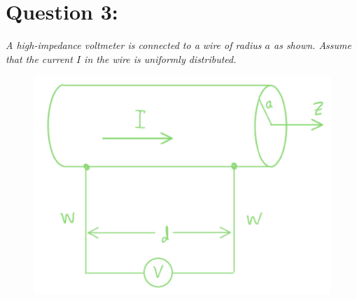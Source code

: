\documentclass[12pt]{article}
\begin{document}
\section*{Question 3:}
\emph{A high-impedance voltmeter is connected to a wire of radius $a$ as shown. Assume that the current $I$ in the wire is uniformly distributed.}
\begin{figure}[h]
\centering
\includegraphics[scale=.5]{exam02_question3.png}
\label{fig:3.1}
\end{figure}
\end{document}
